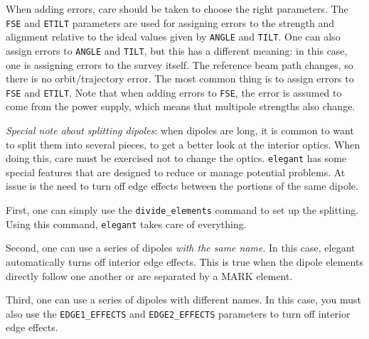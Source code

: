 When adding errors, care should be taken to choose the right
parameters.  The \verb|FSE| and \verb|ETILT| parameters are used for
assigning errors to the strength and alignment relative to the ideal
values given by \verb|ANGLE| and \verb|TILT|.  One can also assign 
errors to \verb|ANGLE| and \verb|TILT|, but this has a different meaning:
in this case, one is assigning errors to the survey itself.  The reference
beam path changes, so there is no orbit/trajectory error. The most common
thing is to assign errors to \verb|FSE| and \verb|ETILT|.  Note that when
adding errors to \verb|FSE|, the error is assumed to come from the power
supply, which means that multipole strengths also change.

{\em Special note about splitting dipoles}: when dipoles are long, it is
common to want to split them into several pieces, to get a better look
at the interior optics.  When doing this, care must be exercised not
to change the optics.  {\tt elegant} has some special features that
are designed to reduce or manage potential problems. At issue is the
need to turn off edge effects between the portions of the same dipole.

First, one can simply use the \verb|divide_elements| command to set up
the splitting.  Using this command, {\tt elegant} takes care of everything.

Second, one can use a series of dipoles {\em with the same name}.  In this case,
elegant automatically turns off interior edge effects.  This is true when the
dipole elements directly follow one another or are separated by a MARK element.

Third, one can use a series of dipoles with different names.  In this case, you
must also use the \verb|EDGE1_EFFECTS| and \verb|EDGE2_EFFECTS| parameters to
turn off interior edge effects.  
